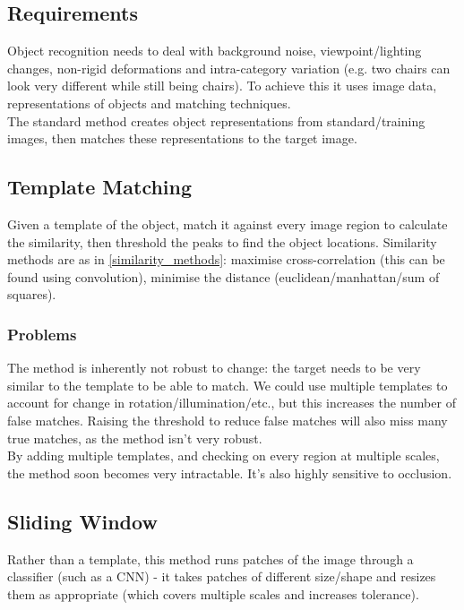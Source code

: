 \subsection{Requirements}
Object recognition needs to deal with background noise, viewpoint/lighting changes, non-rigid deformations and intra-category variation (e.g. two chairs can look very different while still being chairs). To achieve this it uses image data, representations of objects and matching techniques.  \\

The standard method creates object representations from standard/training images, then matches these representations to the target image. 

\subsection{Template Matching}
Given a template of the object, match it against every image region to calculate the similarity, then threshold the peaks to find the object locations. Similarity methods are as in \ref{similarity_methods}: maximise cross-correlation (this can be found using convolution), minimise the distance (euclidean/manhattan/sum of squares).

\subsubsection{Problems}
The method is inherently not robust to change: the target needs to be very similar to the template to be able to match. We could use multiple templates to account for change in rotation/illumination/etc., but this increases the number of false matches. Raising the threshold to reduce false matches will also miss many true matches, as the method isn't very robust.\\

By adding multiple templates, and checking on every region at multiple scales, the method soon becomes very intractable. It's also highly sensitive to occlusion.

\subsection{Sliding Window}
Rather than a template, this method runs patches of the image through a classifier (such as a CNN) - it takes patches of different size/shape and resizes them as appropriate (which covers multiple scales and increases tolerance). \\

